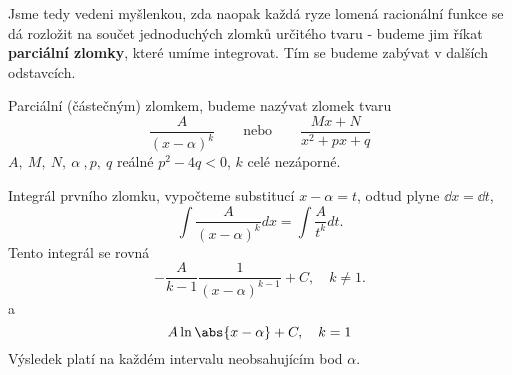       
      
      Jsme tedy vedeni myšlenkou, zda naopak každá ryze lomená racionální funkce se dá rozložit
      na součet jednoduchých zlomků určitého tvaru - budeme jim říkat \textbf{parciální zlomky},
      které umíme integrovat. Tím se budeme zabývat v dalších odstavcích. 
    
      
      
      \begin{mdframed}[style=mdmathdef] 
        \begin{definition} Parciální (částečným) zlomkem, budeme nazývat zlomek tvaru
          \begin{equation}
              \frac{A}{(x-\alpha)^k} \qquad\text{nebo}\qquad\frac{Mx + N}{x^2 + px +q}
          \end{equation}  
          $A,\ M,\ N,\ \alpha\ , p,\ q$ reálné $p^2-4q < 0$, $k$ celé nezáporné.         
        \end{definition}
      \end{mdframed}    
      
      Integrál prvního zlomku, vypočteme substitucí $x-\alpha=t$, odtud plyne \(\dd{x} = \dd{t}\),
      \begin{equation}\label{MA:int_ex_14}
        \boxed{\int\frac{A}{(x-\alpha)^k}dx = \int\frac{A}{t^k}dt.}
      \end{equation}
      Tento integrál se rovná
      \begin{equation}\label{MA:int_ex_16}
        -\frac{A}{k-1}\frac{1}{(x-\alpha)^{k-1}} + C, \quad k\neq1.
      \end{equation}  
      a 
      \begin{equation}
        A\ln\abs{x-\alpha} + C, \quad k = 1
      \end{equation}      
      Výsledek platí na každém intervalu neobsahujícím bod \(\alpha\).
      
